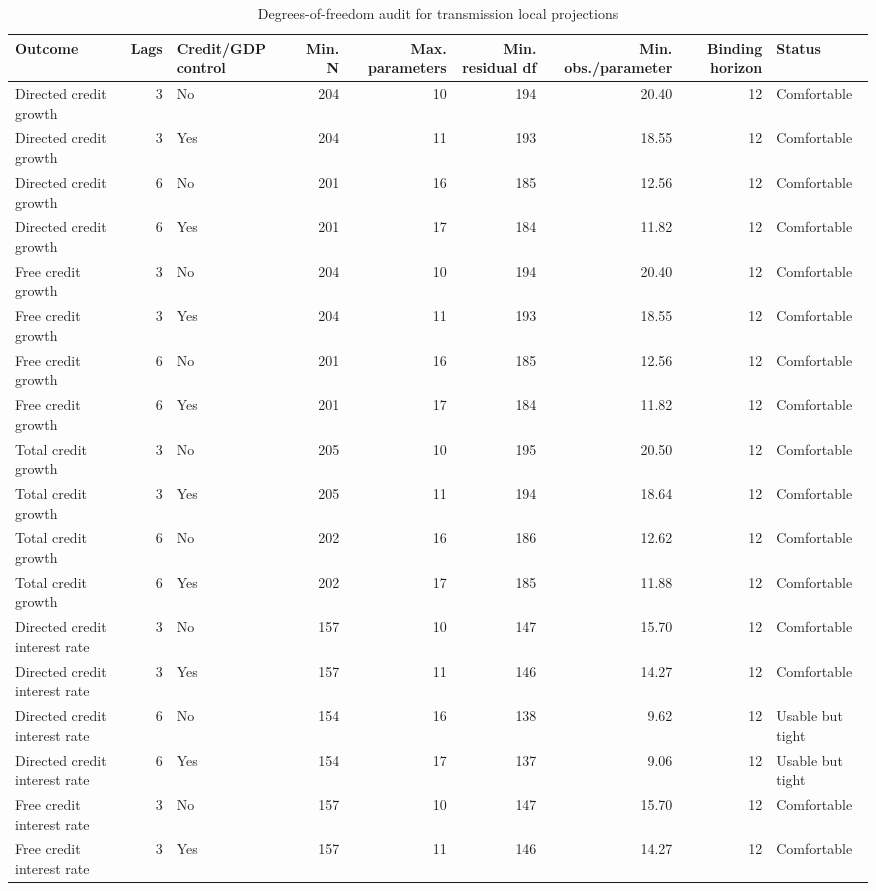 \begin{table}

\caption{Degrees-of-freedom audit for transmission local projections}
\centering
\begin{tabular}[t]{lrlrrrrrl}
\toprule
Outcome & Lags & Credit/GDP control & Min. N & Max. parameters & Min. residual df & Min. obs./parameter & Binding horizon & Status\\
\midrule
Directed credit growth & 3 & No & 204 & 10 & 194 & 20.40 & 12 & Comfortable\\
Directed credit growth & 3 & Yes & 204 & 11 & 193 & 18.55 & 12 & Comfortable\\
Directed credit growth & 6 & No & 201 & 16 & 185 & 12.56 & 12 & Comfortable\\
Directed credit growth & 6 & Yes & 201 & 17 & 184 & 11.82 & 12 & Comfortable\\
Free credit growth & 3 & No & 204 & 10 & 194 & 20.40 & 12 & Comfortable\\
\addlinespace
Free credit growth & 3 & Yes & 204 & 11 & 193 & 18.55 & 12 & Comfortable\\
Free credit growth & 6 & No & 201 & 16 & 185 & 12.56 & 12 & Comfortable\\
Free credit growth & 6 & Yes & 201 & 17 & 184 & 11.82 & 12 & Comfortable\\
Total credit growth & 3 & No & 205 & 10 & 195 & 20.50 & 12 & Comfortable\\
Total credit growth & 3 & Yes & 205 & 11 & 194 & 18.64 & 12 & Comfortable\\
\addlinespace
Total credit growth & 6 & No & 202 & 16 & 186 & 12.62 & 12 & Comfortable\\
Total credit growth & 6 & Yes & 202 & 17 & 185 & 11.88 & 12 & Comfortable\\
Directed credit interest rate & 3 & No & 157 & 10 & 147 & 15.70 & 12 & Comfortable\\
Directed credit interest rate & 3 & Yes & 157 & 11 & 146 & 14.27 & 12 & Comfortable\\
Directed credit interest rate & 6 & No & 154 & 16 & 138 & 9.62 & 12 & Usable but tight\\
\addlinespace
Directed credit interest rate & 6 & Yes & 154 & 17 & 137 & 9.06 & 12 & Usable but tight\\
Free credit interest rate & 3 & No & 157 & 10 & 147 & 15.70 & 12 & Comfortable\\
Free credit interest rate & 3 & Yes & 157 & 11 & 146 & 14.27 & 12 & Comfortable\\

\end{tabular}
\end{table}
